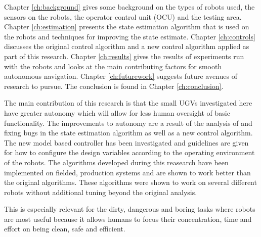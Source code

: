 Chapter \ref{ch:background} gives some background on the types of robots used, the sensors on the robots, the operator control unit (OCU) and the testing area. Chapter \ref{ch:estimation} presents the state estimation algorithm that is used on the robots and techniques for improving the state estimate. Chapter \ref{ch:controls} discusses the original control algorithm and a new control algorithm applied as part of this research. Chapter \ref{ch:results} gives the results of experiments run with the robots and looks at the main contributing factors for smooth autonomous navigation. Chapter \ref{ch:futurework} suggests future avenues of research to pursue. The conclusion is found in Chapter \ref{ch:conclusion}.

The main contribution of this research is that the small UGVs investigated here have greater autonomy which will allow for less human oversight of basic functionality. The improvements to autonomy are a result of the analysis of and fixing bugs in the state estimation algorithm as well as a new control algorithm. The new model based controller has been investigated and guidelines are given for how to configure the design variables according to the operating environment of the robots. The algorithms developed during this reasearch have been implemented on fielded, production systems and are shown to work better than the original algorithms. These algorithms were shown to work on several different robots without additional tuning beyond the original analysis.

This is especially relevant for the dirty, dangerous and boring tasks where robots are most useful because it allows humans to focus their concentration, time and effort on being clean, safe and efficient.

